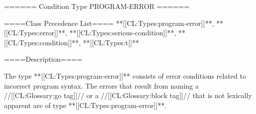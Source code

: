 ====== Condition Type PROGRAM-ERROR ======

====Class Precedence List==== **[[CL:Types:program-error]]**, **[[CL:Types:error]]**, **[[CL:Types:serious-condition]]**, **[[CL:Types:condition]]**, **[[CL:Types:t]]**

====Description====

The type **[[CL:Types:program-error]]** consists of error conditions related to incorrect program syntax. The errors that result from naming a //[[CL:Glossary:go tag]]// or a //[[CL:Glossary:block tag]]// that is not lexically apparent are of type **[[CL:Types:program-error]]**.

